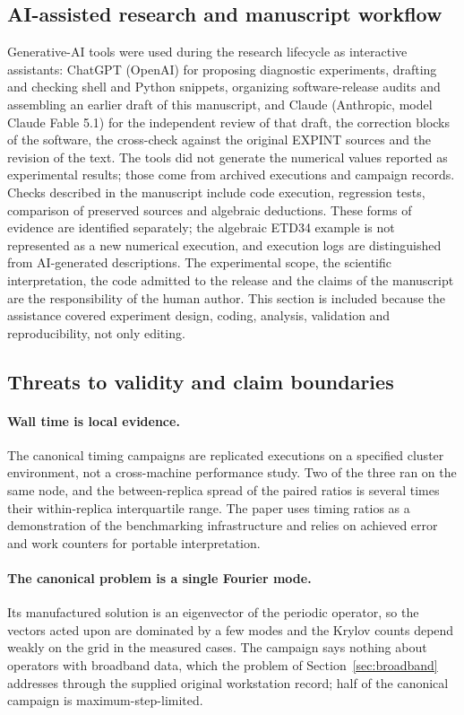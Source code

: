 \subsection{AI-assisted research and manuscript workflow}\label{sec:ai-use}

Generative-AI tools were used during the research lifecycle as interactive
assistants: ChatGPT (OpenAI) for proposing diagnostic experiments, drafting and
checking shell and Python snippets, organizing software-release audits and
assembling an earlier draft of this manuscript, and Claude (Anthropic, model
Claude Fable 5.1) for the independent review of that draft, the correction
blocks of the software, the cross-check against the original EXPINT sources
and the revision of the text.  The tools did not generate the numerical values
reported as experimental results; those come from archived \pkg{} executions
and campaign records.  Checks described in the manuscript include code execution, regression
tests, comparison of preserved sources and algebraic deductions.  These
forms of evidence are identified separately; the algebraic ETD34 example
is not represented as a new numerical execution, and execution logs are distinguished from AI-generated descriptions.  The experimental scope, the scientific
interpretation, the code admitted to the release and the claims of the
manuscript are the responsibility of the human author.  This section is
included because the assistance covered experiment design, coding, analysis,
validation and reproducibility, not only editing.

\subsection{Threats to validity and claim boundaries}

\paragraph{Wall time is local evidence.}
The canonical timing campaigns are replicated executions on a specified
cluster environment, not a cross-machine performance study.  Two of the three
ran on the same node, and the between-replica spread of the paired ratios is
several times their within-replica interquartile range.  The paper uses timing
ratios as a demonstration of the benchmarking infrastructure and relies on
achieved error and work counters for portable interpretation.

\paragraph{The canonical problem is a single Fourier mode.}
Its manufactured solution is an eigenvector of the periodic operator, so the
vectors acted upon are dominated by a few modes and the Krylov counts depend
weakly on the grid in the measured cases.  The campaign says nothing about
operators with broadband data, which the problem of Section~\ref{sec:broadband}
addresses through the supplied original workstation record; half of the
canonical campaign is maximum-step-limited.

